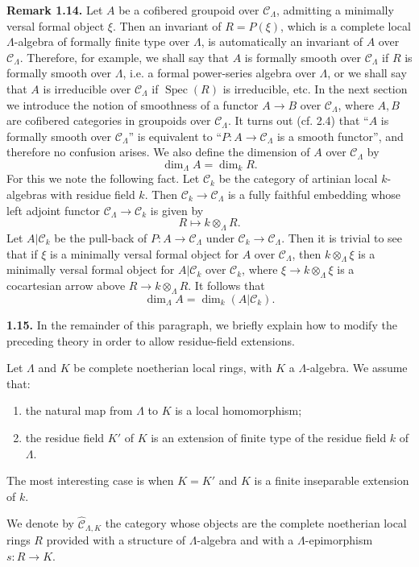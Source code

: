 \documentclass[11pt]{article}
\providecommand{\Spec}{\operatorname{Spec}}
\providecommand{\CL}{\mathcal C_\Lambda}
\begin{document}
\textbf{Remark 1.14.} Let $A$ be a cofibered groupoid over $\CL$, admitting a minimally versal formal object $\xi$. Then an invariant of $R=P(\xi)$, which is a complete local $\Lambda$-algebra of formally finite type over $\Lambda$, is automatically an invariant of $A$ over $\CL$. Therefore, for example, we shall say that $A$ is formally smooth over $\CL$ if $R$ is formally smooth over $\Lambda$, i.e. a formal power-series algebra over $\Lambda$, or we shall say that $A$ is irreducible over $\CL$ if $\Spec(R)$ is irreducible, etc. In the next section we introduce the notion of smoothness of a functor $A\to B$ over $\CL$, where $A,B$ are cofibered categories in groupoids over $\CL$. It turns out (cf. 2.4) that ``$A$ is formally smooth over $\CL$'' is equivalent to ``$P:A\to\CL$ is a smooth functor'', and therefore no confusion arises. We also define the dimension of $A$ over $\CL$ by
\[
 \dim_\Lambda A=\dim_k R.
\]
For this we note the following fact. Let $\mathcal C_k$ be the category of artinian local $k$-algebras with residue field $k$. Then $\mathcal C_k\to\CL$ is a fully faithful embedding whose left adjoint functor $\CL\to\mathcal C_k$ is given by
\[
 R\longmapsto k\otimes_\Lambda R.
\]
Let $A|\mathcal C_k$ be the pull-back of $P:A\to\CL$ under $\mathcal C_k\to\CL$. Then it is trivial to see that if $\xi$ is a minimally versal formal object for $A$ over $\CL$, then $k\otimes_\Lambda\xi$ is a minimally versal formal object for $A|\mathcal C_k$ over $\mathcal C_k$, where $\xi\to k\otimes_\Lambda\xi$ is a cocartesian arrow above $R\to k\otimes_\Lambda R$. It follows that
\[
 \dim_\Lambda A=\dim_k(A|\mathcal C_k).
\]

\textbf{1.15.} In the remainder of this paragraph, we briefly explain how to modify the preceding theory in order to allow residue-field extensions.

Let $\Lambda$ and $K$ be complete noetherian local rings, with $K$ a $\Lambda$-algebra. We assume that:
\begin{enumerate}[label=(\alph*)]
\item the natural map from $\Lambda$ to $K$ is a local homomorphism;
\item the residue field $K'$ of $K$ is an extension of finite type of the residue field $k$ of $\Lambda$.
\end{enumerate}
The most interesting case is when $K=K'$ and $K$ is a finite inseparable extension of $k$.

We denote by $\widehat{\mathcal C}_{\Lambda,K}$ the category whose objects are the complete noetherian local rings $R$ provided with a structure of $\Lambda$-algebra and with a $\Lambda$-epimorphism $s:R\to K$.
\end{document}
